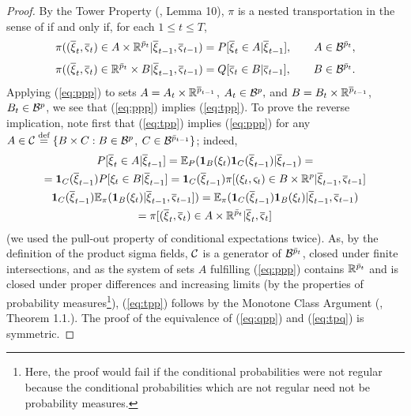 \documentclass{article}              %
\begin{document}
\begin{proof}
By the Tower Property (\cite{pflug2012distance}, Lemma 10), $\pi$
is a nested transportation in the sense of \cite{pflug2012distance}
if and only if, for each $1\leq t\leq T$,
\begin{equation}
\pi((\overline{\xi}_{t},\overline{\varsigma}_{t})\in A\times\mathbb{R}^{\bar{p}_{t}}|\overline{\xi}_{t-1},\overline{\varsigma}_{t-1})=P[\overline{\xi}_{t}\in A|\overline{\xi}_{t-1}],\qquad A\in\mathcal{B}^{\bar{p}_{t}},\label{eq:ppp}
\end{equation}
\begin{equation}
\pi((\overline{\xi}_{t},\overline{\varsigma}_{t})\in\mathbb{R}^{\bar{p}_{t}}\times B|\overline{\xi}_{t-1},\overline{\varsigma}_{t-1})=Q[\overline{\varsigma}_{t}\in B|\overline{\varsigma}_{t-1}],\qquad B\in\mathcal{B}^{\bar{p}_{t}}.\label{eq:qpp}
\end{equation}
Applying (\ref{eq:ppp}) to sets $A=A_{t}\times\mathbb{R}^{\overline{p}_{t-1}}$,
$A_{t}\in\mathcal{B}^{p},$ and $B=B_{t}\times\mathbb{R}^{\overline{p}_{t-1}}$, $B_{t}\in\mathcal{B}^{p}$,
we see that (\ref{eq:ppp}) implies (\ref{eq:tpp}). To prove the
reverse implication, note first that (\ref{eq:tpp}) implies (\ref{eq:ppp})
for any $A\in\mathcal{C}\stackrel{\text{\rm def}}{=}\{B\times C:B\in\mathcal{B}^{p}$, $C\in\mathcal{B}^{\bar{p}_{t-1}}\}$;
indeed, 
\begin{multline*}
P[\overline{\xi}_{t}\in A|\overline{\xi}_{t-1}]=\mathbb{E}_{P}(\mathbf{1}_{B}(\xi_{t})\mathbf{1}_{C}(\overline{\xi}_{t-1})|\overline{\xi}_{t-1})=\\
=\mathbf{1}_{C}(\overline{\xi}_{t-1})P[\xi_{t}\in B|\overline{\xi}_{t-1}]=\mathbf{1}_{C}(\overline{\xi}_{t-1})\pi[(\xi_{t},\varsigma_{t})\in B\times\mathbb{R}^{p}|\overline{\xi}_{t-1},\overline{\varsigma}_{t-1}]\\
\mathbf{1}_{C}(\overline{\xi}_{t-1})\mathbb{E}_{\pi}(\mathbf{1}_{B}(\xi_{t})|\overline{\xi}_{t-1},\overline{\varsigma}_{t-1}])=\mathbb{E}_{\pi}(\mathbf{1}_{C}(\overline{\xi}_{t-1})\mathbf{1}_{B}(\xi_{t})|\overline{\xi}_{t-1},\overline{\varsigma}_{t-1})\\
=\pi[(\overline{\xi}_{t},\overline{\varsigma}_{t})\in A\times\mathbb{R}^{\bar{p}_{t}}|\overline{\xi}_{t},\overline{\varsigma}_{t}]
\end{multline*}
(we used the pull-out property of conditional expectations twice).
As, by the definition of the product sigma fields, $\mathcal{C}$ is a generator
of $\mathcal{B}^{\bar{p}_{t}}$, closed under finite intersections, and as
the system of sets $A$ fulfilling (\ref{eq:ppp}) contains $\mathbb{R}^{\bar{p}_{t}}$
and is closed under proper differences and increasing limits (by the
properties of probability measures\footnote{Here, the proof would fail if the conditional probabilities were not
regular because the conditional probabilities which are not regular
need not be probability measures.}), (\ref{eq:tpp}) follows by the Monotone Class Argument (\cite{Kallenberg02},
Theorem 1.1.). The proof of the equivalence of (\ref{eq:qpp}) and
(\ref{eq:tpq}) is symmetric. 
\end{proof}
\end{document}
